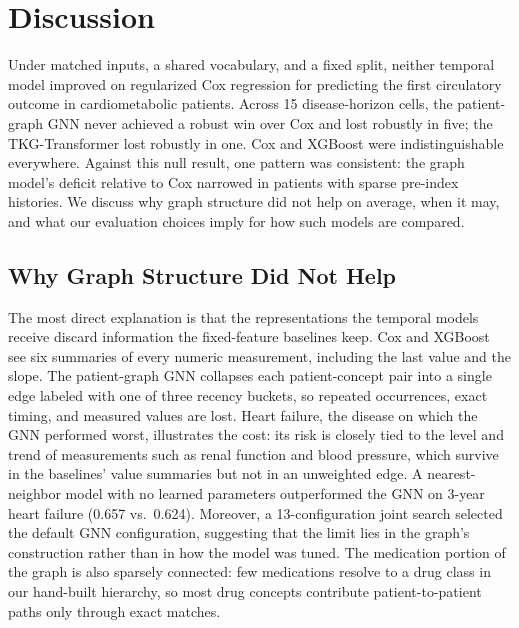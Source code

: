 \section{Discussion}
\label{sec:discussion}

Under matched inputs, a shared vocabulary, and a fixed split, neither temporal model improved on regularized Cox regression for predicting the first circulatory outcome in cardiometabolic patients. Across 15 disease-horizon cells, the patient-graph GNN never achieved a robust win over Cox and lost robustly in five; the TKG-Transformer lost robustly in one. Cox and XGBoost were indistinguishable everywhere. Against this null result, one pattern was consistent: the graph model's deficit relative to Cox narrowed in patients with sparse pre-index histories. We discuss why graph structure did not help on average, when it may, and what our evaluation choices imply for how such models are compared.

\subsection{Why Graph Structure Did Not Help}
\label{sec:disc-why}

The most direct explanation is that the representations the temporal models receive discard information the fixed-feature baselines keep. Cox and XGBoost see six summaries of every numeric measurement, including the last value and the slope. The patient-graph GNN collapses each patient-concept pair into a single edge labeled with one of three recency buckets, so repeated occurrences, exact timing, and measured values are lost. Heart failure, the disease on which the GNN performed worst, illustrates the cost: its risk is closely tied to the level and trend of measurements such as renal function and blood pressure, which survive in the baselines' value summaries but not in an unweighted edge. A nearest-neighbor model with no learned parameters outperformed the GNN on 3-year heart failure (0.657 vs.\ 0.624). Moreover, a 13-configuration joint search selected the default GNN configuration, suggesting that the limit lies in the graph's construction rather than in how the model was tuned. The medication portion of the graph is also sparsely connected: few medications resolve to a drug class in our hand-built hierarchy, so most drug concepts contribute patient-to-patient paths only through exact matches.

